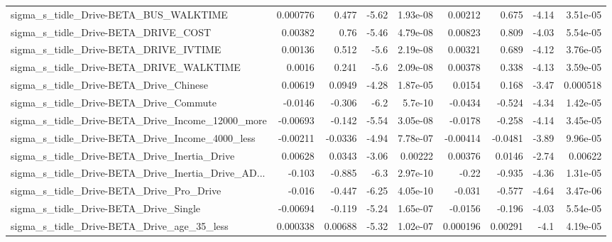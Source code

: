 \begin{tabular}{lrrrrrrrr}
sigma\_s\_tidle\_Drive-BETA\_BUS\_WALKTIME              &    0.000776 &        0.477 &    -5.62 & 1.93e-08 &    0.00212 &       0.675 &        -4.14 &      3.51e-05 \\
sigma\_s\_tidle\_Drive-BETA\_DRIVE\_COST                &     0.00382 &         0.76 &    -5.46 & 4.79e-08 &    0.00823 &       0.809 &        -4.03 &      5.54e-05 \\
sigma\_s\_tidle\_Drive-BETA\_DRIVE\_IVTIME              &     0.00136 &        0.512 &     -5.6 & 2.19e-08 &    0.00321 &       0.689 &        -4.12 &      3.76e-05 \\
sigma\_s\_tidle\_Drive-BETA\_DRIVE\_WALKTIME            &      0.0016 &        0.241 &     -5.6 & 2.09e-08 &    0.00378 &       0.338 &        -4.13 &      3.59e-05 \\
sigma\_s\_tidle\_Drive-BETA\_Drive\_Chinese             &     0.00619 &       0.0949 &    -4.28 & 1.87e-05 &     0.0154 &       0.168 &        -3.47 &      0.000518 \\
sigma\_s\_tidle\_Drive-BETA\_Drive\_Commute             &     -0.0146 &       -0.306 &     -6.2 &  5.7e-10 &    -0.0434 &      -0.524 &        -4.34 &      1.42e-05 \\
sigma\_s\_tidle\_Drive-BETA\_Drive\_Income\_12000\_more   &    -0.00693 &       -0.142 &    -5.54 & 3.05e-08 &    -0.0178 &      -0.258 &        -4.14 &      3.45e-05 \\
sigma\_s\_tidle\_Drive-BETA\_Drive\_Income\_4000\_less    &    -0.00211 &      -0.0336 &    -4.94 & 7.78e-07 &   -0.00414 &     -0.0481 &        -3.89 &      9.96e-05 \\
sigma\_s\_tidle\_Drive-BETA\_Drive\_Inertia\_Drive       &     0.00628 &       0.0343 &    -3.06 &  0.00222 &    0.00376 &      0.0146 &        -2.74 &       0.00622 \\
sigma\_s\_tidle\_Drive-BETA\_Drive\_Inertia\_Drive\_AD... &      -0.103 &       -0.885 &     -6.3 & 2.97e-10 &      -0.22 &      -0.935 &        -4.36 &      1.31e-05 \\
sigma\_s\_tidle\_Drive-BETA\_Drive\_Pro\_Drive           &      -0.016 &       -0.447 &    -6.25 & 4.05e-10 &     -0.031 &      -0.577 &        -4.64 &      3.47e-06 \\
sigma\_s\_tidle\_Drive-BETA\_Drive\_Single              &    -0.00694 &       -0.119 &    -5.24 & 1.65e-07 &    -0.0156 &      -0.196 &        -4.03 &      5.54e-05 \\
sigma\_s\_tidle\_Drive-BETA\_Drive\_age\_35\_less         &    0.000338 &      0.00688 &    -5.32 & 1.02e-07 &   0.000196 &     0.00291 &         -4.1 &      4.19e-05 \\

\end{tabular}
